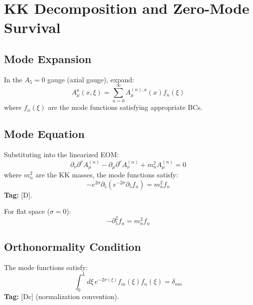 \documentclass[11pt,a4paper]{article}
\begin{document}
\section{KK Decomposition and Zero-Mode Survival}
\label{sec:kk-decomp}

\subsection{Mode Expansion}

In the $A_5 = 0$ gauge (axial gauge), expand:
\begin{equation}
  A_\mu^a(x,\xi) = \sum_{n=0}^{\infty} A_\mu^{(n),a}(x) f_n(\xi)
  \label{eq:kk-expansion}
\end{equation}
where $f_n(\xi)$ are the mode functions satisfying appropriate BCs.

\subsection{Mode Equation}

Substituting into the linearized EOM:
\begin{equation}
  \partial_\nu \partial^\nu A_\mu^{(n)} - \partial_\mu \partial^\nu A_\nu^{(n)}
  + m_n^2 A_\mu^{(n)} = 0
  \label{eq:4d-eom}
\end{equation}
where $m_n^2$ are the KK masses, the mode functions satisfy:
\begin{equation}
  \boxed{-e^{2\sigma} \partial_5 (e^{-2\sigma} \partial_5 f_n) = m_n^2 f_n}
  \label{eq:mode-equation}
\end{equation}
\textbf{Tag:} [D].

For flat space ($\sigma = 0$):
\begin{equation}
  -\partial_5^2 f_n = m_n^2 f_n
  \label{eq:mode-flat}
\end{equation}

\subsection{Orthonormality Condition}

The mode functions satisfy:
\begin{equation}
  \int_0^L d\xi \, e^{-2\sigma(\xi)} f_m(\xi) f_n(\xi) = \delta_{mn}
  \label{eq:orthonormality}
\end{equation}
\textbf{Tag:} [Dc] (normalization convention).
\end{document}
